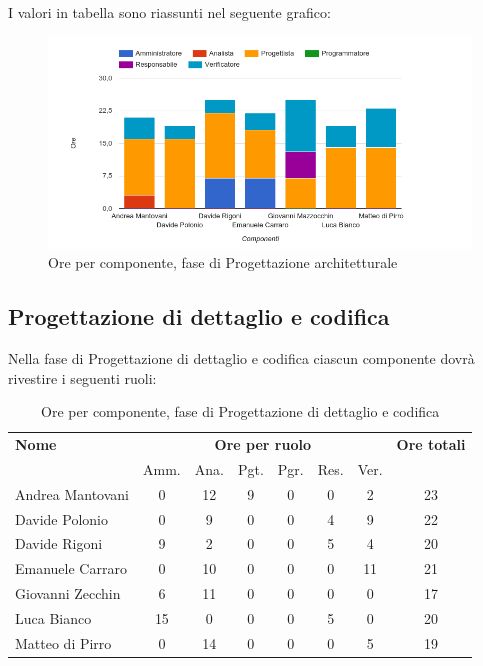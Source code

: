 I valori in tabella sono riassunti nel seguente grafico: \\ 

    \begin{figure}[H]
      \begin{center}
        \includegraphics[width=12cm]{res/img/orePerComponenteProgettazioneArchitetturale.png}
      \caption{Ore per componente, fase di Progettazione architetturale}
      \end{center} 
    \end{figure}    
    
    
    
    
\pagebreak
\subsection{Progettazione di dettaglio e codifica}
Nella fase di Progettazione di dettaglio e codifica ciascun componente dovrà rivestire i seguenti ruoli:

\begin{table}[H]
\begin{tabular}{lccccccc}
\toprule
    \textbf{Nome}  & \multicolumn{6}{c}{\textbf{Ore per ruolo}} & \textbf{Ore totali} \\
     & Amm. & Ana. & Pgt. & Pgr. & Res. & Ver. & \\
    \midrule
    
	Andrea Mantovani & 0 & 12 & 9 & 0 & 0 & 2 & 23 \\
	Davide Polonio & 0 & 9 & 0 & 0 & 4 & 9 & 22 \\
	Davide Rigoni & 9 & 2 & 0 & 0 & 5 & 4 & 20 \\
	Emanuele Carraro & 0 & 10 & 0 & 0 & 0 & 11 & 21 \\
	Giovanni Zecchin & 6 & 11 & 0 & 0 & 0 & 0 & 17 \\
	Luca Bianco & 15 & 0 & 0 & 0 & 5 & 0 & 20 \\
	Matteo di Pirro & 0 & 14 & 0 & 0 & 0 & 5 & 19 \\
    
    \bottomrule
\end{tabular}
\caption{Ore per componente, fase di Progettazione di dettaglio e codifica}
\end{table}


